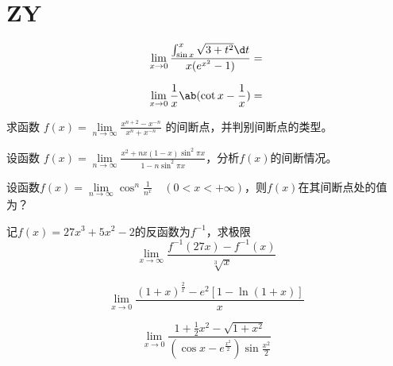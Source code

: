 \section{ZY}
\begin{question}
    \begin{equation}
        \nonumber
        \lim_{ x \to 0 } \frac{ \int_{\sin x}^{x} \sqrt{ 3 + t^2 } \d t }{ x ( e^{x^2} - 1 ) } = 
    \end{equation}
\end{question}

\begin{question}
    \begin{equation}
        \nonumber
        \lim_{ x \to 0 } \frac{1}{x} \ab( \cot x - \frac{1}{x} ) = 
    \end{equation}
\end{question}

\begin{question}
    求函数 $ f(x) = \lim\limits_{ n \to \infty } \frac{ x^{ n + 2 } - x^{ -n } }{ x^n + x^{ -n } } $ 的间断点，并判别间断点的类型。
\end{question}

\begin{question}
    设函数 $ f(x) = \lim\limits_{ n \to \infty } \frac{ x^2 + nx( 1 - x ) \sin ^2 \pi x }{ 1 - n \sin^2 \pi x } $，分析$ f(x) $的间断情况。 
\end{question}

\begin{question}
    设函数$ f(x) =\lim\limits_{ n \to \infty } \cos^n \frac{ 1 }{ n^x } \quad (0 < x < + \infty) $，则$ f(x) $在其间断点处的值为？
\end{question}

\begin{question}
    记$ f(x) = 27x^3 + 5x^2 - 2 $的反函数为$ f^{-1} $，求极限
    \begin{equation}
        \nonumber
        \lim_{ x \to \infty } \frac{ f^{-1} (27x) - f^{-1} (x) }{ \sqrt[3]{x} }
    \end{equation}
\end{question}

\begin{question}
    \begin{equation}
        \nonumber
        \lim_{x \to 0} \frac{ (1 + x) ^ \frac{2}{x} - e^2 [1 - \ln(1 + x)] }{x}
    \end{equation}
\end{question}

\begin{question}
    \begin{equation}
        \nonumber
        \lim_{x \to 0} \frac{ 1 + \frac{1}{2} x^2 - \sqrt{ 1 + x^2 } }{ ( \cos x - e^{ \frac{x^2}{2} }) \sin \frac{x^2}{2} }
    \end{equation}
\end{question}

